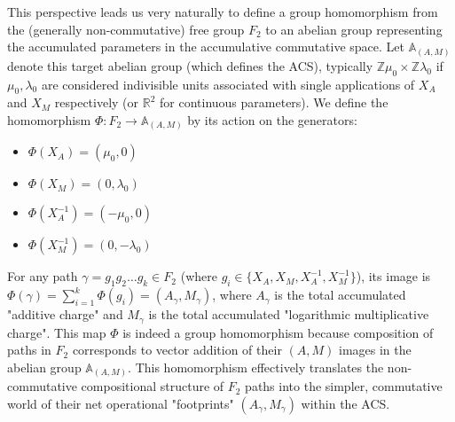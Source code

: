 This perspective leads us very naturally to define a group homomorphism from the (generally non-commutative) free group $F_2$ to an abelian group representing the accumulated parameters in the accumulative commutative space. Let $\mathbb{A}_{(A,M)}$ denote this target abelian group (which defines the ACS), typically $\mathbb{Z}\mu_0 \times \mathbb{Z}\lambda_0$ if $\mu_0, \lambda_0$ are considered indivisible units associated with single applications of $X_A$ and $X_M$ respectively (or $\mathbb{R}^2$ for continuous parameters). We define the homomorphism $\Phi: F_2 \to \mathbb{A}_{(A,M)}$ by its action on the generators:
\begin{itemize}
    \item $\Phi(X_A) = (\mu_0, 0)$
    \item $\Phi(X_M) = (0, \lambda_0)$
    \item $\Phi(X_A^{-1}) = (-\mu_0, 0)$
    \item $\Phi(X_M^{-1}) = (0, -\lambda_0)$
\end{itemize}
For any path $\gamma = g_1 g_2 \dots g_k \in F_2$ (where $g_i \in \{X_A, X_M, X_A^{-1}, X_M^{-1}\}$), its image is $\Phi(\gamma) = \sum_{i=1}^k \Phi(g_i) = (A_\gamma, M_\gamma)$, where $A_\gamma$ is the total accumulated "additive charge" and $M_\gamma$ is the total accumulated "logarithmic multiplicative charge". This map $\Phi$ is indeed a group homomorphism because composition of paths in $F_2$ corresponds to vector addition of their $(A,M)$ images in the abelian group $\mathbb{A}_{(A,M)}$. This homomorphism effectively translates the non-commutative compositional structure of $F_2$ paths into the simpler, commutative world of their net operational "footprints" $(A_\gamma, M_\gamma)$ within the ACS.

